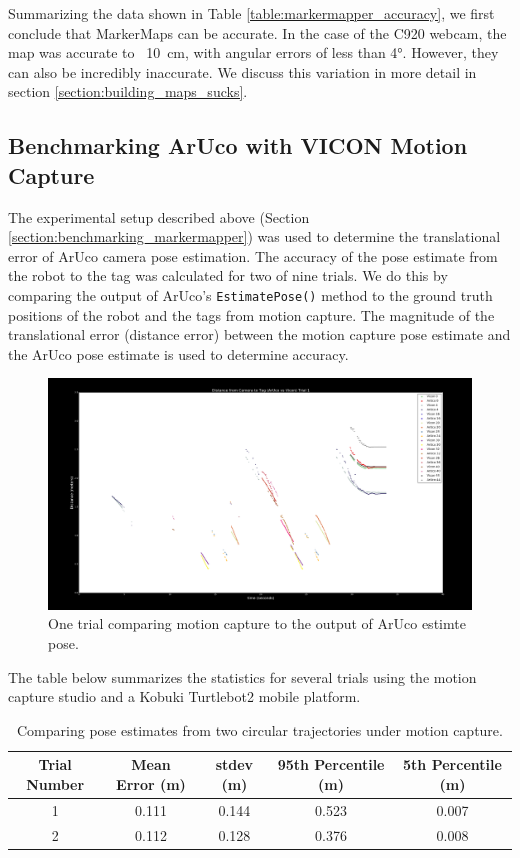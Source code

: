 \documentclass{article}
\begin{document}
    Summarizing the data shown in Table \ref{table:markermapper_accuracy}, we first conclude that MarkerMaps can be accurate. In the case of the C920 webcam, the map was accurate to ~\SI{10}{\centi\meter}, with angular errors of less than \ang{4}. However, they can also be incredibly inaccurate. We discuss this variation in more detail in section \ref{section:building_maps_sucks}.

  \subsection{Benchmarking ArUco with VICON Motion Capture}

    The experimental setup described above (Section \ref{section:benchmarking_markermapper}) was used to determine the translational error of ArUco camera pose estimation. The accuracy of the pose estimate from the robot to the tag was calculated for two of nine trials. We do this by comparing the output of ArUco's \texttt{EstimatePose()} method to the ground truth positions of the robot and the tags from motion capture. The magnitude of the translational error (distance error) between the motion capture pose estimate and the ArUco pose estimate is used to determine accuracy.

    \begin{figure}[H]
      \centering
      \includegraphics[width=0.98\linewidth]{./images/aruco_cam_to_tag_trial_1_3_17.png}
      \caption{One trial comparing motion capture to the output of ArUco estimte pose.}
      \label{fig:aruco_trialone_dist_comparison}
    \end{figure}

    The table below summarizes the statistics for several trials using the motion capture studio and a Kobuki Turtlebot2 mobile platform.

    \begin{table}[H]
      \centering
      \begin{tabular}{|c|c|c|c|c|} \hline
        Trial Number & Mean Error (m) & stdev (m) & 95th Percentile (m) & 5th Percentile (m) \\ \hline
        1 & 0.111 & 0.144 & 0.523 & 0.007 \\ \hline
        2 & 0.112 & 0.128 & 0.376 & 0.008 \\ \hline
      \end{tabular}
      \caption{Comparing pose estimates from two circular trajectories under motion capture.}
      \label{table:aruco_accuracy}
    \end{table}
\end{document}

